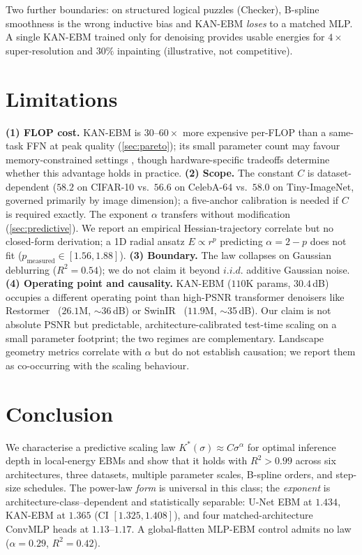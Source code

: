 \documentclass{article}
\begin{document}
Two further boundaries: on structured logical puzzles (Checker), B-spline smoothness is the wrong inductive bias and KAN-EBM \emph{loses} to a matched MLP. A single KAN-EBM trained only for denoising provides usable energies for $4\times$ super-resolution and $30\%$ inpainting (illustrative, not competitive).

\section{Limitations}
\label{sec:limitations}
\textbf{(1) FLOP cost.} KAN-EBM is $30$--$60{\times}$ more expensive per-FLOP than a same-task FFN at peak quality (\cref{sec:pareto}); its small parameter count may favour memory-constrained settings \citep{horowitz2014energy, lin2020mcunet}, though hardware-specific tradeoffs determine whether this advantage holds in practice. \textbf{(2) Scope.} The constant $C$ is dataset-dependent ($58.2$ on CIFAR-10 vs.~$56.6$ on CelebA-64 vs.~$58.0$ on Tiny-ImageNet, governed primarily by image dimension); a five-anchor calibration is needed if $C$ is required exactly. The exponent $\alpha$ transfers without modification (\cref{sec:predictive}). We report an empirical Hessian-trajectory correlate but no closed-form derivation; a 1D radial ansatz $E{\propto}r^p$ predicting $\alpha{=}2{-}p$ does not fit ($p_{\mathrm{measured}}\!\in\![1.56, 1.88]$). \textbf{(3) Boundary.} The law collapses on Gaussian deblurring ($R^2{=}0.54$); we do not claim it beyond $i.i.d.$ additive Gaussian noise. \textbf{(4) Operating point and causality.} KAN-EBM ($110$K params, $30.4$\,dB) occupies a different operating point than high-PSNR transformer denoisers like Restormer~\citep{zamir2022restormer} ($26.1$M, $\sim$36\,dB) or SwinIR~\citep{liang2021swinir} ($11.9$M, $\sim$35\,dB). Our claim is not absolute PSNR but predictable, architecture-calibrated test-time scaling on a small parameter footprint; the two regimes are complementary. Landscape geometry metrics correlate with $\alpha$ but do not establish causation; we report them as co-occurring with the scaling behaviour.

\section{Conclusion}
We characterise a predictive scaling law $K^{*}(\sigma) \approx C\sigma^\alpha$ for optimal inference depth in local-energy EBMs and show that it holds with $R^2{>}0.99$ across six architectures, three datasets, multiple parameter scales, B-spline orders, and step-size schedules. The power-law \emph{form} is universal in this class; the \emph{exponent} is architecture-class--dependent and statistically separable: U-Net EBM at $1.434$, KAN-EBM at $1.365$ (CI $[1.325, 1.408]$), and four matched-architecture ConvMLP heads at $1.13$--$1.17$. A global-flatten MLP-EBM control admits no law ($\alpha{=}0.29$, $R^2{=}0.42$).
\end{document}
